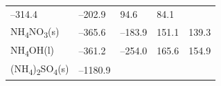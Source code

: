 \documentclass[
]{book}
\theoremstyle{definition}
\theoremstyle{definition}
\theoremstyle{definition}
\theoremstyle{remark}
\begin{document}
\begin{longtable}[]{@{}lllll@{}}
\begin{minipage}[t]{0.19\columnwidth}
--314.4\strut
\end{minipage} & \begin{minipage}[t]{0.20\columnwidth}\raggedright
--202.9\strut
\end{minipage} & \begin{minipage}[t]{0.18\columnwidth}\raggedright
94.6\strut
\end{minipage} & \begin{minipage}[t]{0.18\columnwidth}\raggedright
84.1\strut
\end{minipage}\tabularnewline
\begin{minipage}[t]{0.10\columnwidth}\raggedright
NH\textsubscript{4}NO\textsubscript{3}(s)\strut
\end{minipage} & \begin{minipage}[t]{0.19\columnwidth}\raggedright
--365.6\strut
\end{minipage} & \begin{minipage}[t]{0.20\columnwidth}\raggedright
--183.9\strut
\end{minipage} & \begin{minipage}[t]{0.18\columnwidth}\raggedright
151.1\strut
\end{minipage} & \begin{minipage}[t]{0.18\columnwidth}\raggedright
139.3\strut
\end{minipage}\tabularnewline
\begin{minipage}[t]{0.10\columnwidth}\raggedright
NH\textsubscript{4}OH(l)\strut
\end{minipage} & \begin{minipage}[t]{0.19\columnwidth}\raggedright
--361.2\strut
\end{minipage} & \begin{minipage}[t]{0.20\columnwidth}\raggedright
--254.0\strut
\end{minipage} & \begin{minipage}[t]{0.18\columnwidth}\raggedright
165.6\strut
\end{minipage} & \begin{minipage}[t]{0.18\columnwidth}\raggedright
154.9\strut
\end{minipage}\tabularnewline
\begin{minipage}[t]{0.10\columnwidth}\raggedright
(NH\textsubscript{4})\textsubscript{2}SO\textsubscript{4}(s)\strut
\end{minipage} & \begin{minipage}[t]{0.19\columnwidth}\raggedright
--1180.9\strut
\end{minipage} & \begin{minipage}[t]{0.20\columnwidth}\raggedright

\end{minipage}
\end{longtable}
\end{document}
